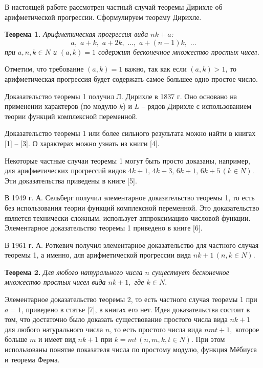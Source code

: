 








В настоящей работе рассмотрен частный случай теоремы Дирихле об арифметической прогрессии. Сформулируем теорему Дирихле.

\textbf{Теорема 1.} \emph{Арифметическая прогрессия вида $nk+a$:
$$a,\,\, a+ k,\,\, a+2k,\,\, …,\,\, a+ (n -1)k,\,\, …$$
при $a,n,k \in N$ и $(a,k)= 1$ содержит бесконечное множество простых чисел.}

Отметим, что требование $(a,k)= 1$  важно, так как если $(a,k)> 1$, то арифметическая прогрессия будет содержать самое большее одно простое число.

Доказательство теоремы 1 получил Л. Дирихле в 1837 г. Оно основано на применении характеров (по модулю $k$) и $L$ -- рядов Дирихле с использованием теории функций комплексной переменной.

Доказательство теоремы 1 или более сильного результата можно найти в книгах [1] -- [3]. О характерах можно узнать из книги [4].

Некоторые частные случаи теоремы 1 могут быть просто доказаны, например, для арифметических прогрессий видов $4k +1,\, 4k+ 3,\, 6k+ 1,\, 6k+ 5\, (k \in N).$ Эти доказательства приведены в книге [5].

В 1949 г. А. Сельберг получил элементарное доказательство теоремы 1, то есть без использования теории функций комплексной переменной. Это доказательство является технически сложным, использует аппроксимацию числовой функции. Элементарное доказательство теоремы 1 приведено в книге [6].

В 1961 г. А. Роткевич получил элементарное доказательство для частного случая теоремы 1, а именно, для арифметической прогрессии вида $nk+ 1\, (n,k \in N).$

\textbf{Теорема 2.} \emph{Для любого натурального числа $n$ существует бесконечное множество простых чисел вида $nk+1,$ где $k\in N.$}

Элементарное доказательство теоремы 2, то есть частного случая теоремы 1 при $a= 1$, приведено в статье [7], в книгах его нет. Идея доказательства состоит в том, что достаточно было доказать существование простого числа вида $nk +1$ для любого натурального числа $n$, то есть простого числа вида $n m t+ 1,$ которое больше $m$  и имеет вид $nk +1$ при  $k= m t \,(n,m,k,t \in N).$ При этом использованы понятие показателя числа по простому модулю, функция Мёбиуса и теорема Ферма.






